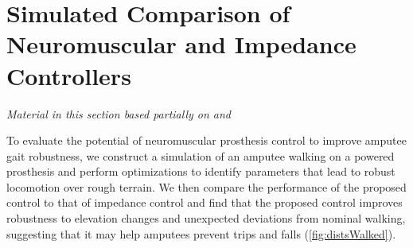 \chapter{Simulated Comparison of Neuromuscular and Impedance
Controllers}\label{sec:control_sim}

\graphicspath{{chapters/control_simulation/figures/}}

\emph{Material in this section based partially on
\citet{thatte2016toward}\cite{thatte2016toward} and
\citet{thatte2014towards}\cite[0.25in]{thatte2014towards}} \linebreak

To evaluate the potential of neuromuscular prosthesis control to improve amputee
gait robustness, we construct a simulation of an amputee walking on a powered
prosthesis and perform optimizations to identify parameters that lead to robust
locomotion over rough terrain. We then compare the performance of the proposed
control to that of impedance control and find that the proposed control improves
robustness to elevation changes and unexpected deviations from nominal walking,
suggesting that it may help amputees prevent trips and falls
(\cref{fig:distsWalked}).




